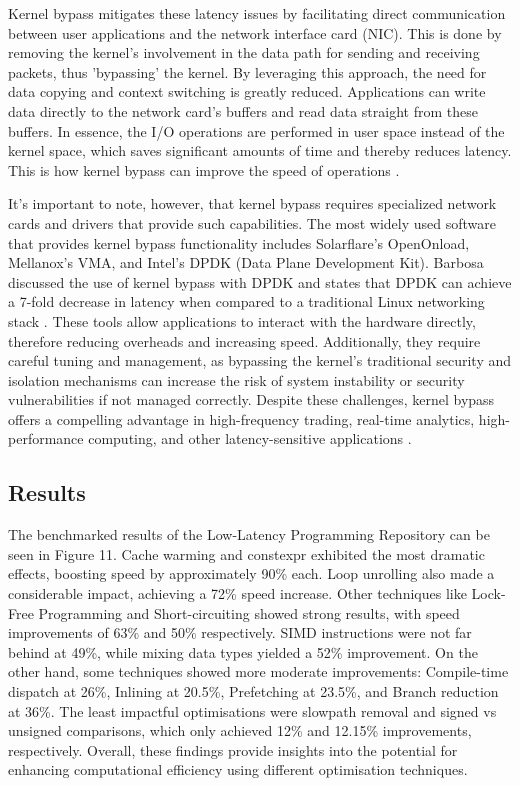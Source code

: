 \documentclass{article}
\theoremstyle{break}
\begin{document}
Kernel bypass mitigates these latency issues by facilitating direct communication between user applications and the network interface card (NIC). This is done by removing the kernel's involvement in the data path for sending and receiving packets, thus 'bypassing' the kernel. By leveraging this approach, the need for data copying and context switching is greatly reduced. Applications can write data directly to the network card's buffers and read data straight from these buffers. In essence, the I/O operations are performed in user space instead of the kernel space, which saves significant amounts of time and thereby reduces latency. This is how kernel bypass can improve the speed of operations \cite{Qazi}.

It's important to note, however, that kernel bypass requires specialized network cards and drivers that provide such capabilities. The most widely used software that provides kernel bypass functionality includes Solarflare's OpenOnload, Mellanox's VMA, and Intel's DPDK (Data Plane Development Kit). Barbosa discussed the use of kernel bypass with DPDK and states that DPDK can achieve a 7-fold decrease in latency when compared to a traditional Linux networking stack \cite{Barbosa}. These tools allow applications to interact with the hardware directly, therefore reducing overheads and increasing speed. Additionally, they require careful tuning and management, as bypassing the kernel's traditional security and isolation mechanisms can increase the risk of system instability or security vulnerabilities if not managed correctly. Despite these challenges, kernel bypass offers a compelling advantage in high-frequency trading, real-time analytics, high-performance computing, and other latency-sensitive applications \cite{ThomasR}.




\subsection{Results}

The benchmarked results of the Low-Latency Programming Repository can be seen in Figure 11. Cache warming and constexpr exhibited the most dramatic effects, boosting speed by approximately 90\% each. Loop unrolling also made a considerable impact, achieving a 72\% speed increase. Other techniques like Lock-Free Programming and Short-circuiting showed strong results, with speed improvements of 63\% and 50\% respectively. SIMD instructions were not far behind at 49\%, while mixing data types yielded a 52\% improvement. On the other hand, some techniques showed more moderate improvements: Compile-time dispatch at 26\%, Inlining at 20.5\%, Prefetching at 23.5\%, and Branch reduction at 36\%. The least impactful optimisations were slowpath removal and signed vs unsigned comparisons, which only achieved 12\% and 12.15\% improvements, respectively. Overall, these findings provide insights into the potential for enhancing computational efficiency using different optimisation techniques.
\end{document}

